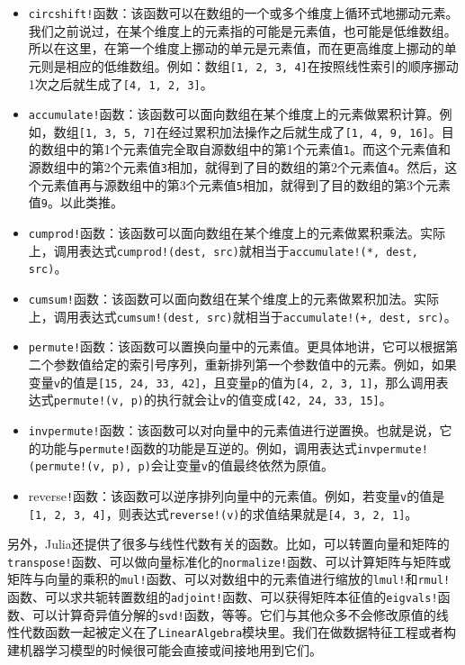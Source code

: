 \begin{itemize}
\item \verb`circshift!`函数：该函数可以在数组的一个或多个维度上循环式地挪动元素。我们之前说过，在某个维度上的元素指的可能是元素值，也可能是低维数组。所以在这里，在第一个维度上挪动的单元是元素值，而在更高维度上挪动的单元则是相应的低维数组。例如：数组\verb`[1, 2, 3, 4]`在按照线性索引的顺序挪动1次之后就生成了\verb`[4, 1, 2, 3]`。
\item \verb`accumulate!`函数：该函数可以面向数组在某个维度上的元素做累积计算。例如，数组\verb`[1, 3, 5, 7]`在经过累积加法操作之后就生成了\verb`[1, 4, 9, 16]`。目的数组中的第1个元素值完全取自源数组中的第1个元素值\verb`1`。而这个元素值和源数组中的第2个元素值\verb`3`相加，就得到了目的数组的第2个元素值\verb`4`。然后，这个元素值再与源数组中的第3个元素值\verb`5`相加，就得到了目的数组的第3个元素值\verb`9`。以此类推。
\item  \verb`cumprod!`函数：该函数可以面向数组在某个维度上的元素做累积乘法。实际上，调用表达式\verb`cumprod!(dest, src)`就相当于\verb`accumulate!(*, dest, src)`。
\item \verb`cumsum!`函数：该函数可以面向数组在某个维度上的元素做累积加法。实际上，调用表达式\verb`cumsum!(dest, src)`就相当于\verb`accumulate!(+, dest, src)`。
\item \verb`permute!`函数：该函数可以置换向量中的元素值。更具体地讲，它可以根据第二个参数值给定的索引号序列，重新排列第一个参数值中的元素。例如，如果变量\verb`v`的值是\verb`[15, 24, 33, 42]`，且变量\verb`p`的值为\verb`[4, 2, 3, 1]`，那么调用表达式\verb`permute!(v, p)`的执行就会让\verb`v`的值变成\verb`[42, 24, 33, 15]`。
\item \verb`invpermute!`函数：该函数可以对向量中的元素值进行逆置换。也就是说，它的功能与\verb`permute!`函数的功能是互逆的。例如，调用表达式\verb`invpermute!(permute!(v, p), p)`会让变量\verb`v`的值最终依然为原值。
\item reverse\verb`!`函数：该函数可以逆序排列向量中的元素值。例如，若变量\verb`v`的值是\verb`[1, 2, 3, 4]`，则表达式\verb`reverse!(v)`的求值结果就是\verb`[4, 3, 2, 1]`。
\end{itemize}

另外，Julia还提供了很多与线性代数有关的函数。比如，可以转置向量和矩阵的\verb`transpose!`函数、可以做向量标准化的\verb`normalize!`函数、可以计算矩阵与矩阵或矩阵与向量的乘积的\verb`mul!`函数、可以对数组中的元素值进行缩放的\verb`lmul!`和\verb`rmul!`函数、可以求共轭转置数组的\verb`adjoint!`函数、可以获得矩阵本征值的\verb`eigvals!`函数、可以计算奇异值分解的\verb`svd!`函数，等等。它们与其他众多不会修改原值的线性代数函数一起被定义在了\verb`LinearAlgebra`模块里。我们在做数据特征工程或者构建机器学习模型的时候很可能会直接或间接地用到它们。
